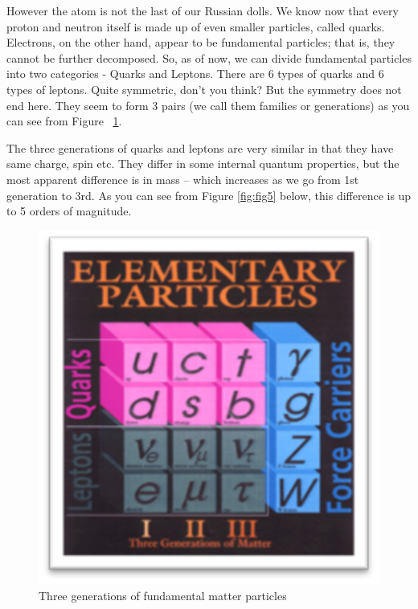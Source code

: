 However the atom is not the last of our Russian dolls. We know now that every proton and neutron itself is made up of even smaller particles, called quarks. Electrons, on the other hand, appear to be fundamental particles; that is, they cannot be further decomposed. 
So, as of now, we can divide fundamental particles into two categories - Quarks and Leptons.  There are 6 types of quarks and 6 types of leptons. Quite symmetric, don't you think?  But the symmetry does not end here. They seem to form 3 pairs (we call them families or generations) as you can see from Figure ~\ref{fig:fig3}.

The three generations of quarks and leptons are very similar in that they have same charge, spin etc. They differ in some internal quantum properties, but the most apparent difference is in mass – which increases as we go from 1st generation to 3rd.  As you can see from 
Figure \ref{fig:fig5} below, this difference is up to 5 orders of magnitude.


\begin{figure}[h]
\centering\includegraphics[scale=0.5]{./ElementaryParticles/Pictures/fig3.pdf}
\caption{Three generations of fundamental matter particles}
\label{fig:fig3}
\end{figure}


